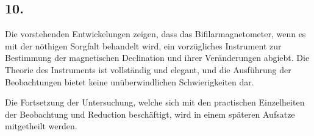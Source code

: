 \documentclass[12pt,a4paper]{article}
\begin{document}
\subsection*{10.}

Die vorstehenden Entwickelungen zeigen, dass das Bifilarmagnetometer, wenn es mit der nöthigen Sorgfalt behandelt wird, ein vorzügliches Instrument zur Bestimmung der magnetischen Declination und ihrer Veränderungen abgiebt. Die Theorie des Instruments ist vollständig und elegant, und die Ausführung der Beobachtungen bietet keine unüberwindlichen Schwierigkeiten dar.

Die Fortsetzung der Untersuchung, welche sich mit den practischen Einzelheiten der Beobachtung und Reduction beschäftigt, wird in einem späteren Aufsatze mitgetheilt werden.
\end{document}

